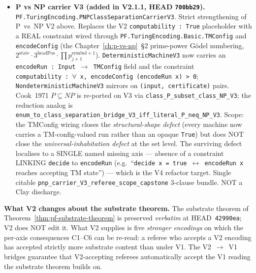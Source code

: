 \begin{itemize}
\item \textbf{P vs NP carrier V3 (added in V2.1.1, HEAD \texttt{700bb29}).}
\texttt{PF.\allowbreak{}Turing\allowbreak{}Encoding.\allowbreak{}PNPClass\allowbreak{}Separation\allowbreak{}Carrier\allowbreak{}V3}. Strict
strengthening of P~vs~NP V2 above. Replaces the V2
\texttt{computability~:~True} placeholder with a REAL constraint
wired through \texttt{PF.\allowbreak{}Turing\allowbreak{}Encoding.\allowbreak{}Basic.\allowbreak{}TMConfig} and
\texttt{encodeConfig} (the Chapter~\ref{ch:p-vs-np}~\S2 prime-power
G\"odel numbering, $2^{\mathrm{state}} \cdot 3^{\mathrm{headPos}}
\cdot \prod p_{j+1}^{\mathrm{symbol}+1}$).
\texttt{DeterministicMachineV3} now carries an
\texttt{encodeRun~:~Input~$\to$~TMConfig} field and the constraint
\texttt{computability~:~$\forall$~x,~encodeConfig~(encodeRun~x)~>~0};
\texttt{NondeterministicMachineV3} mirrors on
\texttt{(input,~certificate)} pairs. Cook~1971 $P \subseteq NP$ is
re-ported on V3 via \texttt{class\_\allowbreak{}P\_\allowbreak{}subset\_\allowbreak{}class\_\allowbreak{}NP\_\allowbreak{}V3}; the
reduction analog is
\texttt{enum\_\allowbreak{}to\_\allowbreak{}class\_\allowbreak{}separation\_\allowbreak{}bridge\_\allowbreak{}V3\_\allowbreak{}iff\_\allowbreak{}literal\_\allowbreak{}P\_\allowbreak{}neq\_\allowbreak{}NP\_\allowbreak{}V3}.
Scope: the TMConfig wiring closes the \emph{structural-shape
defect} (every machine now carries a TM-config-valued run rather
than an opaque \texttt{True}) but does NOT close the
\emph{universal-inhabitation defect} at the set level. The
surviving defect localises to a SINGLE named missing axis ---
absence of a constraint LINKING \texttt{decide} to \texttt{encodeRun}
(e.g.\ ``\texttt{decide~x~=~true~$\leftrightarrow$~encodeRun~x}
reaches accepting TM state'') --- which is the V4 refactor target.
Single citable \texttt{pnp\_\allowbreak{}carrier\_\allowbreak{}V3\_\allowbreak{}referee\_\allowbreak{}scope\_\allowbreak{}capstone}
3-clause bundle. NOT a Clay discharge.
\end{itemize}

\noindent\textbf{What V2 changes about the substrate theorem.}
The substrate theorem of Theorem~\ref{thm:pf-substrate-theorem} is
preserved \emph{verbatim} at HEAD~\texttt{42990ea}; V2 does NOT edit
it. What V2 supplies is five \emph{stronger encodings} on which the
per-axis consequences C1--C6 can be re-read: a referee who accepts a
V2 encoding has accepted strictly more substrate content than under
V1. The V2~$\to$~V1 bridges guarantee that V2-accepting referees
automatically accept the V1 reading the substrate theorem builds on.

